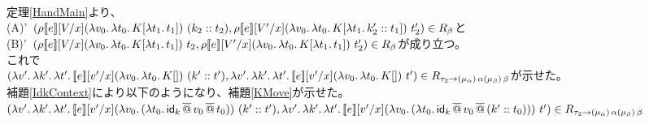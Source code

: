 \\
定理\ref{HandMain}より、\\
(A)'\ $(\rho \CPSTh{e}[\Change{x}{V}] \LamP{v_0}{\Lam{t_0}{K[\Lam{t_1}{t_1}]}}\ \ConsP{k_2}{t_2}, \rho \CPSTh{e}[\Change{x}{V'}] \LamP{v_0}{\Lam{t_0}{K[\Lam{t_1}{\Cons{k_2'}{t_1}}]}}\ t_2')\in R_{\beta}$と\\
(B)'\  $(\rho \CPSTh{e}[\Change{x}{V}] \LamP{v_0}{\Lam{t_0}{K[\Lam{t_1}{t_1}]}}\ t_2, \rho \CPSTh{e}[\Change{x}{V'}] \LamP{v_0}{\Lam{t_0}{K[\Lam{t_1}{t_1}]}}\ t_2')\in R_{\beta}$が成り立つ。\\
これで\\
$(\Lam{v'}{\Lam{k'}{\Lam{t'}{\CPSTh{e}[\Change{x}{v'}] \LamP{v_0}{\Lam{t_0}{K[]}}\ \ConsP{k'}{t'}}}},\\
\Lam{v'}{\Lam{k'}{\Lam{t'}{\CPSTh{e}[\Change{x}{v'}] \LamP{v_0}{\Lam{t_0}{K[]}}\ t'}}})
\in R_{\tau_2 \rightarrow \TrailType{\alpha} \TrailType{\beta}}$が示せた。
\\
補題\ref{IdkContext}により以下のようになり、補題\ref{KMove}が示せた。\\
$(\Lam{v'}{\Lam{k'}{\Lam{t'}{\CPSTh{e}[\Change{x}{v'}] \LamP{v_0}{\LamP{t_0}{\SApp{\Idk}{\SApp{v_0}{t_0}}}}\ \ConsP{k'}{t'}}}},\\
\Lam{v'}{\Lam{k'}{\Lam{t'}{\CPSTh{e}[\Change{x}{v'}] \LamP{v_0}{\LamP{t_0}{\SApp{\Idk}{\SApp{v_0}{\ConsP{k'}{t_0}}}}}\ t'}}})
\in R_{\tau_2 \rightarrow \TrailType{\alpha} \TrailType{\beta}}$\\


